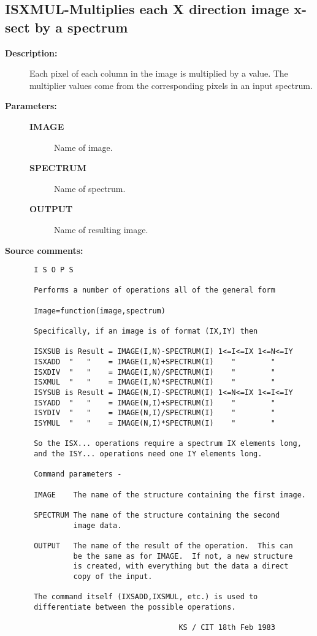 \subsection{ISXMUL-\label{ISXMUL}Multiplies each X direction image x-sect by a spectrum}
\begin{description}

\item [{\bf Description:}]
 Each pixel of each column in the image is multiplied by a value.
 The multiplier values come from the corresponding pixels in an
 input spectrum.

\item [{\bf Parameters:}]
\begin{description}
\item [{\bf IMAGE}]
 Name of image.
\item [{\bf SPECTRUM}]
 Name of spectrum.
\item [{\bf OUTPUT}]
 Name of resulting image.
\end{description}

\item [{\bf Source comments:}]
\begin{verbatim}
 I S O P S

 Performs a number of operations all of the general form

 Image=function(image,spectrum)

 Specifically, if an image is of format (IX,IY) then

 ISXSUB is Result = IMAGE(I,N)-SPECTRUM(I) 1<=I<=IX 1<=N<=IY
 ISXADD  "   "    = IMAGE(I,N)+SPECTRUM(I)    "        "
 ISXDIV  "   "    = IMAGE(I,N)/SPECTRUM(I)    "        "
 ISXMUL  "   "    = IMAGE(I,N)*SPECTRUM(I)    "        "
 ISYSUB is Result = IMAGE(N,I)-SPECTRUM(I) 1<=N<=IX 1<=I<=IY
 ISYADD  "   "    = IMAGE(N,I)+SPECTRUM(I)    "        "
 ISYDIV  "   "    = IMAGE(N,I)/SPECTRUM(I)    "        "
 ISYMUL  "   "    = IMAGE(N,I)*SPECTRUM(I)    "        "

 So the ISX... operations require a spectrum IX elements long,
 and the ISY... operations need one IY elements long.

 Command parameters -

 IMAGE    The name of the structure containing the first image.

 SPECTRUM The name of the structure containing the second
          image data.

 OUTPUT   The name of the result of the operation.  This can
          be the same as for IMAGE.  If not, a new structure
          is created, with everything but the data a direct
          copy of the input.

 The command itself (IXSADD,IXSMUL, etc.) is used to
 differentiate between the possible operations.

                                  KS / CIT 18th Feb 1983
\end{verbatim}
\end{description}
